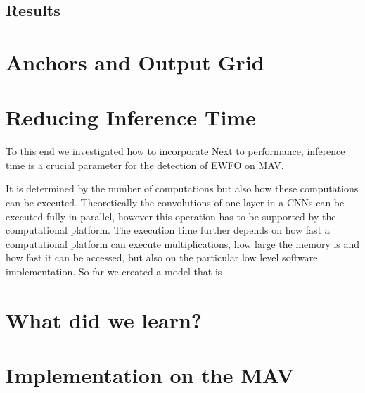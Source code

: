 	 \subsection{Results}
	 
	\section{Anchors and Output Grid}
		
	\section{Reducing Inference Time}
	
	To this end we investigated how to incorporate 
	Next to performance, inference time is a crucial parameter for the detection of \ac{EWFO} on \ac{MAV}. 
	
	 It is determined by the number of computations but also how these computations can be executed. Theoretically the convolutions of one layer in a \acp{CNN} can be executed fully in parallel, however this operation has to be supported by the computational platform. The execution time further depends on how fast a computational platform can execute multiplications, how large the memory is and how fast it can be accessed, but also on the particular low level software implementation. So far we created a model that is 
	 
	 \section{What did we learn?}
	
	\section{Implementation on the \ac{MAV}}